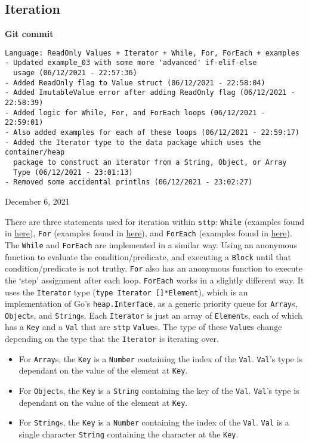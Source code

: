 \subsection{Iteration}

\begin{center}
    \textbf{Git commit}
    \begin{verbatim}
Language: ReadOnly Values + Iterator + While, For, ForEach + examples
- Updated example_03 with some more 'advanced' if-elif-else 
  usage (06/12/2021 - 22:57:36)
- Added ReadOnly flag to Value struct (06/12/2021 - 22:58:04)
- Added ImutableValue error after adding ReadOnly flag (06/12/2021 - 22:58:39)
- Added logic for While, For, and ForEach loops (06/12/2021 - 22:59:01)
- Also added examples for each of these loops (06/12/2021 - 22:59:17)
- Added the Iterator type to the data package which uses the container/heap
  package to construct an iterator from a String, Object, or Array
  Type (06/12/2021 - 23:01:13)
- Removed some accidental printlns (06/12/2021 - 23:02:27)
    \end{verbatim}
    \vspace{-1em}
    \tiny{December 6, 2021}
\end{center}

There are three statements used for iteration within \verb|sttp|: \verb|While| (examples found in \hyperref[appendix:sttp-examples-4]{here}), \verb|For| (examples found in \hyperref[appendix:sttp-examples-5]{here}), and \verb|ForEach| (examples found in \hyperref[appendix:sttp-examples-6]{here}). The \verb|While| and \verb|ForEach| are implemented in a similar way. Using an anonymous function to evaluate the condition/predicate, and executing a \verb|Block| until that condition/predicate is not truthy. \verb|For| also has an anonymous function to execute the `step' assignment after each loop. \verb|ForEach| works in a slightly different way. It uses the \verb|Iterator| type (\texttt{type Iterator []*Element}), which is an implementation of Go's \verb|heap.Interface|, as a generic priority queue for \verb|Array|s, \verb|Object|s, and \verb|String|s. Each \verb|Iterator| is just an array of \verb|Element|s, each of which has a \verb|Key| and a \verb|Val| that are \verb|sttp| \verb|Value|s. The type of these \verb|Value|s change depending on the type that the \verb|Iterator| is iterating over.

\begin{itemize}
    \item For \verb|Array|s, the \verb|Key| is a \verb|Number| containing the index of the \verb|Val|. \verb|Val|'s type is dependant on the value of the element at \verb|Key|.
    \item For \verb|Object|s, the \verb|Key| is a \verb|String| containing the key of the \verb|Val|. \verb|Val|'s type is dependant on the value of the element at \verb|Key|.
    \item For \verb|String|s, the \verb|Key| is a \verb|Number| containing the index of the \verb|Val|. \verb|Val| is a single character \verb|String| containing the character at the \verb|Key|.
\end{itemize}

